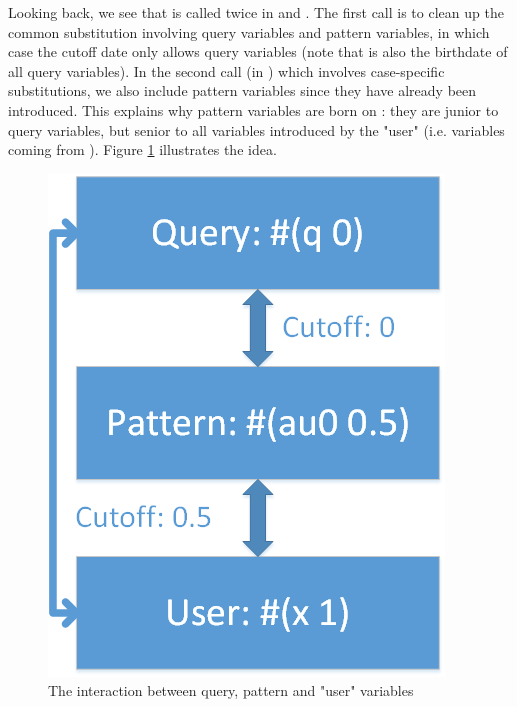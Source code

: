 Looking back, we see that  is called twice in  and . The first call is to clean up the common substitution involving query variables and pattern variables, in which case the cutoff date only allows query variables (note that  is also the birthdate of all query variables). In the second call (in ) which involves case-specific substitutions, we also include pattern variables since they have already been introduced. This explains why pattern variables are born on : they are junior to query variables, but senior to all variables introduced by the "user" (i.e. variables coming from ). Figure \ref{fig:au_S} illustrates the idea.
\begin{figure}[h]
    \centering
    \includegraphics{figures/au_S.png}
    \caption{The interaction between query, pattern and "user" variables}
    \label{fig:au_S}
\end{figure}


